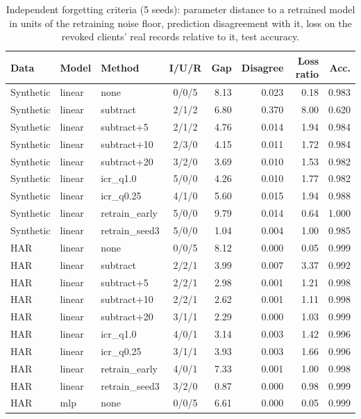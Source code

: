 \begin{table}[h]
\centering
\caption{Independent forgetting criteria (5 seeds): parameter distance to a retrained model in units of the retraining noise floor, prediction disagreement with it, loss on the revoked clients' real records relative to it, test accuracy.}\label{tab:s_forget}
\footnotesize
\setlength{\tabcolsep}{3pt}
\begin{tabular}{@{}lllcrrrr@{}}
\toprule
Data & Model & Method & I/U/R & Gap & Disagree & Loss ratio & Acc. \\
\midrule
Synthetic & linear & none & 0/0/5 & 8.13 & 0.023 & 0.18 & 0.983 \\
Synthetic & linear & subtract & 2/1/2 & 6.80 & 0.370 & 8.00 & 0.620 \\
Synthetic & linear & subtract+5 & 2/1/2 & 4.76 & 0.014 & 1.94 & 0.984 \\
Synthetic & linear & subtract+10 & 2/3/0 & 4.15 & 0.011 & 1.72 & 0.984 \\
Synthetic & linear & subtract+20 & 3/2/0 & 3.69 & 0.010 & 1.53 & 0.982 \\
Synthetic & linear & icr\_q1.0 & 5/0/0 & 4.26 & 0.010 & 1.77 & 0.982 \\
Synthetic & linear & icr\_q0.25 & 4/1/0 & 5.60 & 0.015 & 1.94 & 0.988 \\
Synthetic & linear & retrain\_early & 5/0/0 & 9.79 & 0.014 & 0.64 & 1.000 \\
Synthetic & linear & retrain\_seed3 & 5/0/0 & 1.04 & 0.004 & 1.00 & 0.985 \\
HAR & linear & none & 0/0/5 & 8.12 & 0.000 & 0.05 & 0.999 \\
HAR & linear & subtract & 2/2/1 & 3.99 & 0.007 & 3.37 & 0.992 \\
HAR & linear & subtract+5 & 2/2/1 & 2.98 & 0.001 & 1.21 & 0.998 \\
HAR & linear & subtract+10 & 2/2/1 & 2.62 & 0.001 & 1.11 & 0.998 \\
HAR & linear & subtract+20 & 3/1/1 & 2.29 & 0.000 & 1.03 & 0.999 \\
HAR & linear & icr\_q1.0 & 4/0/1 & 3.14 & 0.003 & 1.42 & 0.996 \\
HAR & linear & icr\_q0.25 & 3/1/1 & 3.93 & 0.003 & 1.66 & 0.996 \\
HAR & linear & retrain\_early & 4/0/1 & 7.33 & 0.001 & 1.00 & 0.998 \\
HAR & linear & retrain\_seed3 & 3/2/0 & 0.87 & 0.000 & 0.98 & 0.999 \\
HAR & mlp & none & 0/0/5 & 6.61 & 0.000 & 0.05 & 0.999 \\

\end{tabular}
\end{table}
